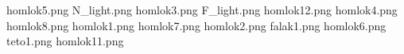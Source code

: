 homlok5.png
N_light.png
homlok3.png
F_light.png
homlok12.png
homlok4.png
homlok8.png
homlok1.png
homlok7.png
homlok2.png
falak1.png
homlok6.png
teto1.png
homlok11.png
